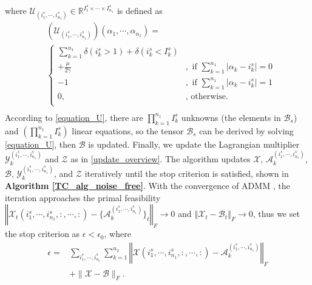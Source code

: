 \documentclass[12pt, draftcls, onecolumn]{IEEEtran}
\theoremstyle{plain}
\theoremstyle{definition}
\theoremstyle{remark}
\begin{document}
where $\mathcal{U}_{(i^s_1,\cdots,i^s_{n_1})}\in\mathbb{R}^{I^{s}_1\times\cdots\times I^{s}_{n_1}}$ is defined as
\begin{equation*}
\begin{aligned}
	&\left(\mathcal{U}_{(i^s_1,\cdots,i^s_{n_1})}\right)({\alpha_1,\cdots,\alpha_{n_1}})=\\
	    &\left\{
	            \begin{array}{ll}
	             \sum_{k=1}^{n_1}\delta(i^s_k>1)+\delta(i^s_k<I^s_k)\\
	             + \frac{\mu}{2\gamma}&,\text{ if }\sum_{k=1}^{n_1}\vert\alpha_k-i_k^s\vert=0\\
	             -1 &,\text{ if }\sum_{k=1}^{n_1}\vert\alpha_k-i_k^s\vert=1\\
	             0, & \text{, otherwise}.\\%
	             \end{array}
	        \right.\\
\end{aligned}
\end{equation*}
According to \eqref{equation_U}, there are $\prod_{k=1}^{n_1}I^s_k$ unknowns (the elements in $\mathcal B_s$) and $(\prod_{k=1}^{n_1}I^s_k)$ linear equations, so the tensor $\mathcal B_s$ can be derived by solving \eqref{equation_U}, then $\mathcal B$ is updated. 
Finally, we update the Lagrangian multiplier $\mathcal{Y}^{(i^s_{1},\cdots,i^s_{n_1})}_k$ and $\mathcal Z$ as in \eqref{update_overview}.
The algorithm updates $\mathcal X$, $\mathcal{A}^{(i^s_{1},\cdots,i^s_{n_1})}_k$, $\mathcal B$, $\mathcal{Y}^{(i^s_{1},\cdots,i^s_{n_1})}_k$, and $\mathcal Z$ iteratively until the stop criterion is satisfied, shown in \textbf{Algorithm \ref{TC_alg_noise_free}}.
With the convergence of ADMM \cite{Boyd:2011:DOS:2185815.2185816}, the iteration approaches the primal feasibility
$\left\Vert\mathcal{X}_t(i^s_{1},\cdots,i^s_{n_1},:,\cdots,:)-\{\mathcal{A}^{(i^s_{1},\cdots,i^s_{n_1})}_k\}_t\right\Vert_F\rightarrow 0$ and $\left\Vert\mathcal X _t- \mathcal B_t\right\Vert_F\rightarrow 0$, thus we set the stop criterion as $\epsilon < \epsilon_0$, where
\begin{align}
  \label{epsilon_update}
  \nonumber
  \epsilon=&\sum_{i^s_{1},\cdots,i^s_{n_1}}\sum_{k=1}^{n_2}\left\Vert\mathcal{X}(i^s_{1},\cdots,i^s_{n_1},:,\cdots,:)-\mathcal{A}^{(i^s_{1},\cdots,i^s_{n_1})}_k\right\Vert_F\\&+\lVert\mathcal X - \mathcal B\rVert_F.
\end{align}
\end{document}
